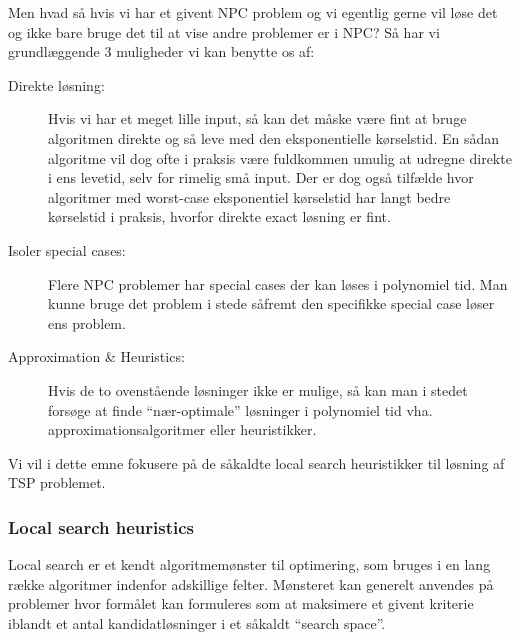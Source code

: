 Men hvad så hvis vi har et givent NPC problem og vi egentlig gerne vil løse det og ikke bare bruge det til at vise andre problemer er i NPC? Så har vi grundlæggende 3 muligheder vi kan benytte os af:

\begin{description}
 \item[Direkte løsning:] Hvis vi har et meget lille input, så kan det måske være fint at bruge algoritmen direkte og så leve med den eksponentielle kørselstid. En sådan algoritme vil dog ofte i praksis være fuldkommen umulig at udregne direkte i ens levetid, selv for rimelig små input. Der er dog også tilfælde hvor algoritmer med worst-case eksponentiel kørselstid har langt bedre kørselstid i praksis, hvorfor direkte exact løsning er fint.
 \item[Isoler special cases:] Flere NPC problemer har special cases der kan løses i polynomiel tid. Man kunne bruge det problem i stede såfremt den specifikke special case løser ens problem.
 \item[Approximation \& Heuristics:] Hvis de to ovenstående løsninger ikke er mulige, så kan man i stedet forsøge at finde ``nær-optimale'' løsninger i polynomiel tid vha. approximationsalgoritmer eller heuristikker.
\end{description}

Vi vil i dette emne fokusere på de såkaldte local search heuristikker til løsning af TSP problemet.


\subsubsection{Local search heuristics}

Local search er et kendt algoritmemønster til optimering, som bruges i en lang række algoritmer indenfor adskillige felter. Mønsteret kan generelt anvendes på problemer hvor formålet kan formuleres som at maksimere et givent kriterie iblandt et antal kandidatløsninger i et såkaldt ``search space''.

